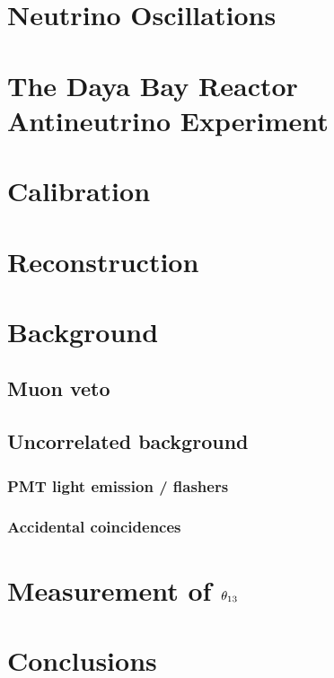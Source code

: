 \documentclass{ucbthesis}
\begin{document}
\chapter{Neutrino Oscillations}

\chapter{The Daya Bay Reactor Antineutrino Experiment}

\chapter{Calibration}

\chapter{Reconstruction}



\chapter{Background}
\label{ch:background}

\section{Muon veto}
\label{sec:muonveto}

\section{Uncorrelated background}

\subsection{PMT light emission / flashers}
\label{subsec:flashers}

\subsection{Accidental coincidences}
\label{subsec:acc}

\chapter{Measurement of \texorpdfstring{$\theta_{13}$}{theta13}}

\chapter{Conclusions}

\appendix


\end{document}
